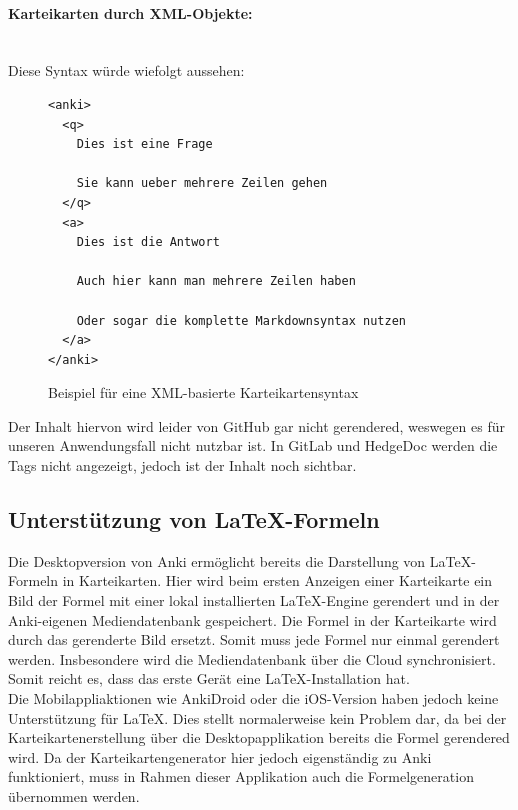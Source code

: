 \documentclass[ngerman]{article}
\begin{document}
\paragraph{Karteikarten durch XML-Objekte:}~\\
Diese Syntax würde wiefolgt aussehen:
\begin{figure}[H]
\centering
\begin{lstlisting}
<anki>
  <q>
    Dies ist eine Frage

    Sie kann ueber mehrere Zeilen gehen
  </q>
  <a>
    Dies ist die Antwort

    Auch hier kann man mehrere Zeilen haben

    Oder sogar die komplette Markdownsyntax nutzen
  </a>
</anki>
\end{lstlisting}
  \caption{Beispiel für eine XML-basierte Karteikartensyntax}
\end{figure}

Der Inhalt hiervon wird leider von GitHub gar nicht gerendered, weswegen es für unseren Anwendungsfall nicht nutzbar ist. In GitLab und HedgeDoc werden die Tags nicht angezeigt, jedoch ist der Inhalt noch sichtbar.

\subsection{Unterst\"utzung von \LaTeX-Formeln}
Die Desktopversion von Anki ermöglicht bereits die Darstellung von \LaTeX-Formeln in Karteikarten. Hier wird beim ersten Anzeigen einer Karteikarte ein Bild der Formel mit einer lokal installierten \LaTeX-Engine gerendert und in der Anki-eigenen Mediendatenbank gespeichert. Die Formel in der Karteikarte wird durch das gerenderte Bild ersetzt. Somit muss jede Formel nur einmal gerendert werden. Insbesondere wird die Mediendatenbank über die Cloud synchronisiert. Somit reicht es, dass das erste Gerät eine \LaTeX-Installation hat.\\

Die Mobilappliaktionen wie AnkiDroid oder die iOS-Version haben jedoch keine Unterstützung für \LaTeX. Dies stellt normalerweise kein Problem dar, da bei der Karteikartenerstellung über die Desktopapplikation bereits die Formel gerendered wird. Da der Karteikartengenerator hier jedoch eigenständig zu Anki funktioniert, muss in Rahmen dieser Applikation auch die Formelgeneration übernommen werden.\\
\end{document}
